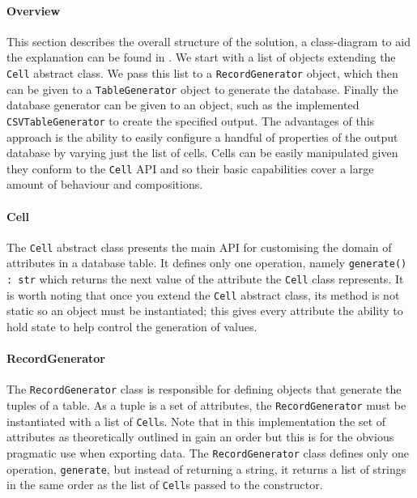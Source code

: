 \paragraph{Overview} This section describes the overall structure of the
solution, a class-diagram to aid the explanation can be found in
.
We start with a list of objects extending the \lstinline{Cell}
abstract class. We pass this list to a \lstinline{RecordGenerator} object, which
then can be given to a \lstinline{TableGenerator} object to generate the
database. Finally the database generator can be given to an object, such as the
implemented \lstinline{CSVTableGenerator} to create the
specified output. The advantages of this approach is the ability to easily
configure a handful of properties of the output database by varying just the list of cells.
Cells can be easily manipulated given they conform to the \lstinline{Cell} API
and so their basic capabilities cover a large amount of behaviour and
compositions.

\paragraph{Cell} The \lstinline{Cell} abstract class presents the main API for
customising the domain of attributes in a database table. It defines only one
operation, namely \lstinline{generate() : str} which returns the next value of
the attribute the \lstinline{Cell} class represents. It is worth noting that
once you extend the \lstinline{Cell} abstract class, its method is not static so
an object must be instantiated; this gives every attribute the ability to hold
state to help control the generation of values.

\paragraph{RecordGenerator} The \lstinline{RecordGenerator} class is
responsible for defining objects that generate the tuples of a table. As a tuple
is a set of attributes, the \lstinline{RecordGenerator} must be instantiated
with a list of \lstinline{Cell}s. Note that in this implementation the set of
attributes as theoretically outlined in  gain an
order but this is for the obvious pragmatic use when exporting data. The
\lstinline{RecordGenerator} class defines only one operation,
\lstinline{generate}, but instead of returning a string, it returns a list of
strings in the same order as the list of \lstinline{Cell}s passed to the
constructor.
